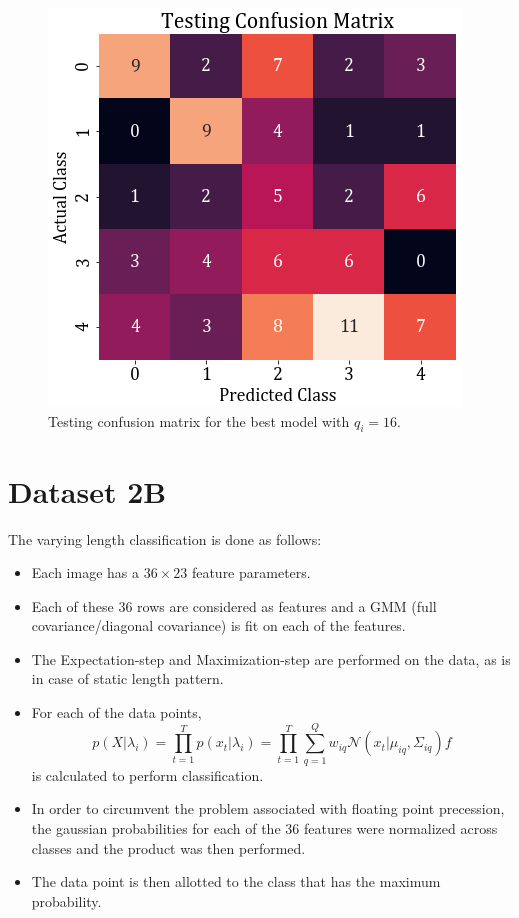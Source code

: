 \documentclass[11pt,a4paper]{article}
\begin{document}
\begin{figure}[H]
    \centering
    \includegraphics[scale=0.5]{images/2A/2A_diag_test_conf.png}
    \caption{Testing confusion matrix for the best model with $q_i=16$.}
\end{figure}


\break
\section{Dataset 2B}
The varying length classification is done as follows:
\begin{itemize}
    \itemsep0em
    \item Each image has a $36\times 23$ feature parameters.
    \item Each of these $36$ rows are considered as features and a GMM (full covariance/diagonal covariance) is fit on each of the features.
    \item The Expectation-step and Maximization-step are performed on the data, as is in case of static length pattern.
    \item For each of the data points, 
    \begin{equation}
    p (X|\lambda_i ) = \prod_{t=1}^T p(x_t|\lambda_i) = \prod_{t=1}^T \sum_{q=1}^Q w_{iq}\mathcal{N}(x_t|\mu_{iq}, \Sigma_{iq})f
    \end{equation}
    is calculated to perform classification.
    \item In order to circumvent the problem associated with floating point precession, the gaussian probabilities for each of the 36 features were normalized across classes and the product was then performed.
    \item The data point is then allotted to the class that has the maximum probability.
\end{itemize}
\end{document}
